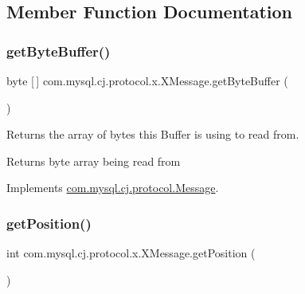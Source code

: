 \subsection{Member Function Documentation}
\mbox{\label{classcom_1_1mysql_1_1cj_1_1protocol_1_1x_1_1_x_message_ae2dfe8871615d85dbd7a8a7320a5025a}} 
\subsubsection{\texorpdfstring{get\+Byte\+Buffer()}{getByteBuffer()}}
{\footnotesize\ttfamily byte \mbox{[}$\,$\mbox{]} com.\+mysql.\+cj.\+protocol.\+x.\+X\+Message.\+get\+Byte\+Buffer (\begin{DoxyParamCaption}{ }\end{DoxyParamCaption})}

Returns the array of bytes this Buffer is using to read from.

\begin{DoxyReturn}{Returns}
byte array being read from 
\end{DoxyReturn}


Implements \mbox{\hyperlink{interfacecom_1_1mysql_1_1cj_1_1protocol_1_1_message_a853af9bf4f09a55058141c7b041a8815}{com.\+mysql.\+cj.\+protocol.\+Message}}.

\mbox{\label{classcom_1_1mysql_1_1cj_1_1protocol_1_1x_1_1_x_message_a5aa5c54128a10a7280a2113c4e24aeb9}} 
\subsubsection{\texorpdfstring{get\+Position()}{getPosition()}}
{\footnotesize\ttfamily int com.\+mysql.\+cj.\+protocol.\+x.\+X\+Message.\+get\+Position (\begin{DoxyParamCaption}{ }\end{DoxyParamCaption})}

